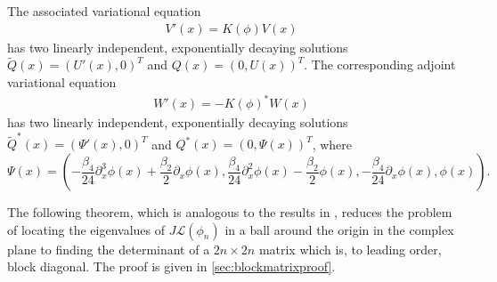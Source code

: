 \documentclass[12pt]{elsarticle}
\def\calL{{\mathcal L}}
\begin{document}
The associated variational equation 
\begin{align}
V'(x) = K(\phi)V(x) \label{vareq}
\end{align}
has two linearly independent, exponentially decaying solutions $\tilde{Q}(x) = (U'(x), 0)^T$ and $Q(x) = (0, U(x))^T$. The corresponding adjoint variational equation
\begin{align}
W'(x) = -K(\phi)^*W(x)\label{adjvareq}
\end{align}
has two linearly independent, exponentially decaying solutions $\tilde{Q}^*(x) = (\Psi'(x), 0)^T$ and $Q^*(x) = (0, \Psi(x) )^T$, where
\begin{equation}\label{defPsi}
\Psi(x) =
\left( -\frac{\beta_4}{24} \partial_x^3 \phi(x) + \frac{\beta_2}{2} \partial_x \phi(x),
\frac{\beta_4}{24} \partial_x^2 \phi(x) - \frac{\beta_2}{2} \phi(x),
- \frac{\beta_4}{24} \partial_x \phi(x), \phi(x) \right).
\end{equation}

The following theorem, which is analogous to the results in \cite[Section 3.4]{Manukian}, reduces the problem of locating the eigenvalues of $J \calL(\phi_n)$ in a ball around the origin in the complex plane to finding the determinant of a $2n\times 2n$ matrix which is, to leading order, block diagonal. The proof is given in \cref{sec:blockmatrixproof}.
\end{document}
